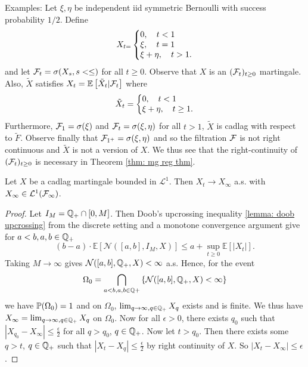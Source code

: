 \documentclass{article}
\begin{document}
\begin{examplesblock}{Examples: }\label{examples: 7}
Let $ \xi , \eta$ be independent iid  symmetric Bernoulli with success probability $ 1/2$. Define
\[
X_{t = }\left\lbrace
\begin{array}{@{}l@{}}
    0, \quad t<1 \\
    \xi, \quad t =1 \\ 
    \xi+\eta, \quad t>1.
\end{array}\right.
\]
and let $ \mathcal{F}_{t} = \sigma(X_{s}, s<\leq)$ for all $ t\geq 0$. Observe that $ X$ is an $ (\mathcal{F}_{t})_{t\geq 0}$ martingale. Also, $ \tilde{X}$ satisfies $ X_{t} = \mathbb{E}\left[ \tilde{X}_{t}|\mathcal{F}_{t} \right]$ where 
\[
	\tilde{X}_{t} = \left\lbrace
	\begin{array}{@{}l@{}}
	    0, \quad t<1 \\
	    \xi+\eta, \quad t\geq 1.
	\end{array}\right.
\]
Furthermore, $ \mathcal{F}_{1} = \sigma(\xi)$ and $ \mathcal{F}_{t} = \sigma(\xi, \eta)$ for all $ t>1$, $ \tilde{X}$ is cadlag with respect to $ \tilde{F}$. Observe finally that $ \mathcal{F}_{1^{+}} = \sigma(\xi, \eta
)$ and so the filtration $ \mathcal{F}$ is not right continuous and $ \tilde{X}$ is not a version of $ X$. We thus see that the right-continuity of $ (\mathcal{F}_{t})_{t\geq 0}$ is necessary in Theorem \ref{thm: mg reg thm}. 
\end{examplesblock}

\begin{theorem}\label{thm: a.s. mg conv thm cont time}
Let $ X$ be a cadlag martingale bounded in $ \mathcal{L}^{1} $. Then $ X_{t}\to X_{\infty}$ a.s. with $ X_{\infty}\in \mathcal{L}^{1}(\mathcal{F}_{\infty}) $. 
\end{theorem}

\begin{proof}
	Let $ I_{M} = \mathbb{Q}_{+}\cap[0,M]$. Then Doob's upcrossing inequality \ref{lemma: doob upcrossing} from the discrete setting and a monotone convergence argument give for $ a<b, a,b \in \mathbb{Q}_{+}$
	\[
		(b-a)\cdot \mathbb{E}\left[ \mathcal{N}([a,b] , I_{M}, X) \right]\leq a + \displaystyle\sup_{t\geq 0}\mathbb{E}\left[ |X_{t}| \right].
	\]
	Taking $ M\to \infty$ gives $ \mathcal{N}([a,b], \mathbb{Q}_{+}, X)<\infty$ a.s. Hence, for the event
	\[
		\Omega_{0} = \displaystyle\bigcap_{a<b, a,b\in \mathbb{Q}+} \left\{ \mathcal{N}([a,b], \mathbb{Q}_{+}, X)<\infty \right\}
	\]
we have $ \mathbb{P}(\Omega_{0})=1$ and on $ \Omega_{0}$, $ \lim_{q\to \infty, q\in \mathbb{Q}_{+}} X_{q}$ exists and is finite. We thus have $ X_{\infty} = \lim_{q\to \infty, q\in \mathbb{Q}_{+}} X_{q}$ on $ \Omega_{0}$.  Now for all $ \epsilon>0$, there exists $ q_{0}$ such that $ |X_{q_{0}}-X_{\infty}|\leq \frac{\epsilon}{2}$ for all $ q>q_{0}$, $ q\in \mathbb{Q}_{+}$. Now let $ t>q_{0}$. Then there exists some $ q>t$, $ q\in \mathbb{Q}_{+}$ such that $ |X_{t}-X_{q}|\leq \frac{\epsilon}{2}$ by right continuity of $ X$. So $ |X_{t}-X_{\infty}|\leq\epsilon$.

\end{proof}
\end{document}

